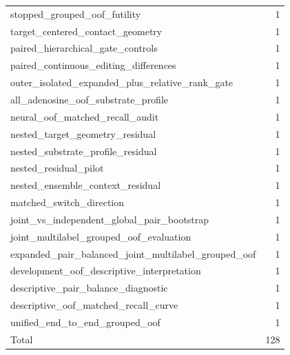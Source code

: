 \begin{longtable}{p{}r}
stopped\_grouped\_oof\_futility & 1 \\
target\_centered\_contact\_geometry & 1 \\
paired\_hierarchical\_gate\_controls & 1 \\
paired\_continuous\_editing\_differences & 1 \\
outer\_isolated\_expanded\_plus\_relative\_rank\_gate & 1 \\
all\_adenosine\_oof\_substrate\_profile & 1 \\
neural\_oof\_matched\_recall\_audit & 1 \\
nested\_target\_geometry\_residual & 1 \\
nested\_substrate\_profile\_residual & 1 \\
nested\_residual\_pilot & 1 \\
nested\_ensemble\_context\_residual & 1 \\
matched\_switch\_direction & 1 \\
joint\_vs\_independent\_global\_pair\_bootstrap & 1 \\
joint\_multilabel\_grouped\_oof\_evaluation & 1 \\
expanded\_pair\_balanced\_joint\_multilabel\_grouped\_oof & 1 \\
development\_oof\_descriptive\_interpretation & 1 \\
descriptive\_pair\_balance\_diagnostic & 1 \\
descriptive\_oof\_matched\_recall\_curve & 1 \\
unified\_end\_to\_end\_grouped\_oof & 1 \\
\midrule
Total & 128 \\
\bottomrule
\end{longtable}

